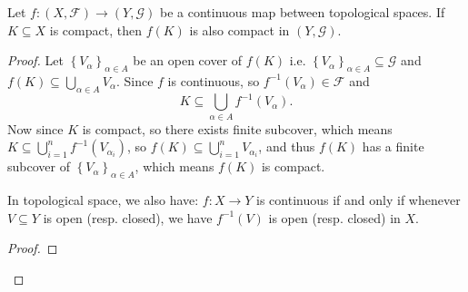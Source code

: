 \begin{theorem} \label{thm: continuous map preserves compact in tp space}
    Let \(f: \left( X, \mathcal{F}  \right) \to  (Y, \mathcal{G} ) \) be a continuous map between topological spaces. If \(K \subseteq X\) is compact, then \(f(K)\) is also compact in \((Y, \mathcal{G} )\).  
\end{theorem}
\begin{proof}
    Let \(\left\{ V_\alpha  \right\}_{\alpha \in A} \) be an open cover of \(f(K)\) i.e. \( \left\{ V_\alpha  \right\}_{\alpha \in A} \subseteq \mathcal{G}\) and \(f(K) \subseteq \bigcup_{\alpha \in A} V_{\alpha }\). Since \(f\) is continuous, so \(f^{-1} \left( V_\alpha  \right) \in \mathcal{F}  \) and 
    \[
        K \subseteq \bigcup_{\alpha \in A} f^{-1} \left( V_\alpha  \right). 
    \] Now since \(K\) is compact, so there exists finite subcover, which means \(K \subseteq \bigcup_{i=1}^{n} f^{-1} \left( V_{\alpha_i} \right)  \), so \(f(K) \subseteq \bigcup_{i=1}^{n} V_{\alpha _i} \), and thus \(f(K)\) has a finite subcover of \(\left\{ V_\alpha  \right\}_{\alpha \in A} \), which means \(f(K)\) is compact.   
    \begin{remark}
        In topological space, we also have: \(f:X \to Y\) is continuous if and only if whenever \(V \subseteq Y\) is open (resp. closed), we have \(f^{-1}(V)\) is open (resp. closed) in \(X\).    
    \end{remark} 
    \begin{proof}
    \end{proof} 
\end{proof}

